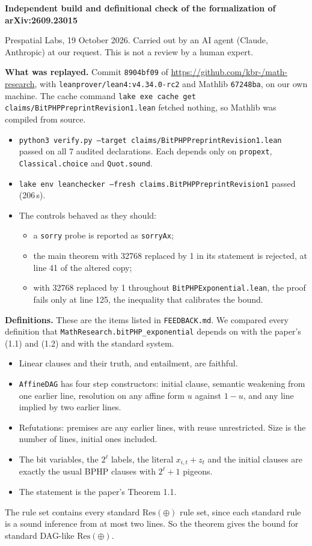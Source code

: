 \documentclass[10pt]{article}
\begin{document}
\raggedright

{\large\bfseries Independent build and definitional check of the formalization of arXiv:2609.23015}

Prespatial Labs, 19 October 2026. Carried out by an AI agent (Claude, Anthropic)
at our request. This is not a review by a human expert.

\textbf{What was replayed.} Commit \texttt{8904bf09} of
\url{https://github.com/kbr-/math-research}, with
\texttt{leanprover/lean4:v4.34.0-rc2} and Mathlib \texttt{67248ba}, on our own
machine. The cache command \texttt{lake exe cache get
claims/BitPHPPreprintRevision1.lean} fetched nothing, so Mathlib was compiled
from source.
\begin{itemize}
\item \texttt{python3 verify.py --target claims/BitPHPPreprintRevision1.lean}
passed on all 7 audited declarations. Each depends only on \texttt{propext},
\texttt{Classical.choice} and \texttt{Quot.sound}.
\item \texttt{lake env leanchecker --fresh claims.BitPHPPreprintRevision1}
passed (206\,s).
\item The controls behaved as they should:
\begin{itemize}
\item a \texttt{sorry} probe is reported as \texttt{sorryAx};
\item the main theorem with 32768 replaced by 1 in its statement is rejected,
at line 41 of the altered copy;
\item with 32768 replaced by 1 throughout \texttt{BitPHPExponential.lean}, the
proof fails only at line 125, the inequality that calibrates the bound.
\end{itemize}
\end{itemize}

\textbf{Definitions.} These are the items listed in \texttt{FEEDBACK.md}. We
compared every definition that \texttt{MathResearch.bitPHP\_exponential}
depends on with the paper's (1.1) and (1.2) and with the standard system.
\begin{itemize}
\item Linear clauses and their truth, and entailment, are faithful.
\item \texttt{AffineDAG} has four step constructors: initial clause, semantic
weakening from one earlier line, resolution on any affine form $u$ against
$1-u$, and any line implied by two earlier lines.
\item Refutations: premises are any earlier lines, with reuse unrestricted.
Size is the number of lines, initial ones included.
\item The bit variables, the $2^\ell$ labels, the literal $x_{i,t}+z_t$ and
the initial clauses are exactly the usual BPHP clauses with $2^\ell+1$
pigeons.
\item The statement is the paper's Theorem 1.1.
\end{itemize}
The rule set contains every standard $\mathrm{Res}(\oplus)$ rule set, since
each standard rule is a sound inference from at most two lines. So the theorem
gives the bound for standard DAG-like $\mathrm{Res}(\oplus)$.
\end{document}
